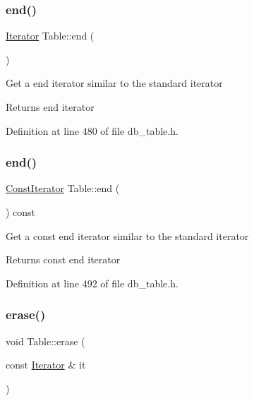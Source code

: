 \subsubsection{\texorpdfstring{end()}{end()}\hspace{0.1cm}{\footnotesize\ttfamily [1/2]}}
{\footnotesize\ttfamily \hyperlink{class_table_1_1_iterator_impl}{Iterator} Table\+::end (\begin{DoxyParamCaption}{ }\end{DoxyParamCaption})\hspace{0.3cm}{\ttfamily [inline]}}

Get a end iterator similar to the standard iterator \begin{DoxyReturn}{Returns}
end iterator 
\end{DoxyReturn}


Definition at line 480 of file db\+\_\+table.\+h.

\mbox{\label{class_table_a7fa70114351a55ad1602f48396d13359}} 
\subsubsection{\texorpdfstring{end()}{end()}\hspace{0.1cm}{\footnotesize\ttfamily [2/2]}}
{\footnotesize\ttfamily \hyperlink{class_table_1_1_iterator_impl}{Const\+Iterator} Table\+::end (\begin{DoxyParamCaption}{ }\end{DoxyParamCaption}) const\hspace{0.3cm}{\ttfamily [inline]}}

Get a const end iterator similar to the standard iterator \begin{DoxyReturn}{Returns}
const end iterator 
\end{DoxyReturn}


Definition at line 492 of file db\+\_\+table.\+h.

\mbox{\label{class_table_a9597c9976c3b83f757171f44c4101120}} 
\subsubsection{\texorpdfstring{erase()}{erase()}}
{\footnotesize\ttfamily void Table\+::erase (\begin{DoxyParamCaption}\item[{const \hyperlink{class_table_1_1_iterator_impl}{Iterator} \&}]{it }\end{DoxyParamCaption})\hspace{0.3cm}{\ttfamily [inline]}}

